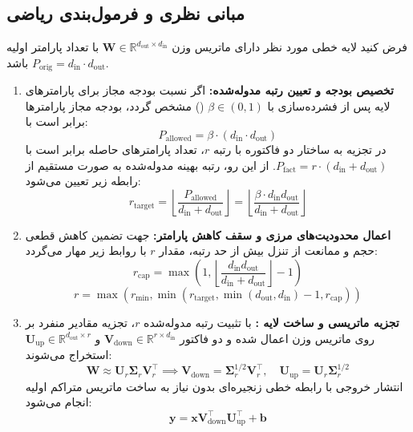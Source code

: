 \subsection{مبانی نظری و فرمول‌بندی ریاضی}
فرض کنید لایه خطی مورد نظر دارای ماتریس وزن $\mathbf{W} \in \mathbb{R}^{d_{\text{out}} \times d_{\text{in}}}$ با تعداد پارامتر اولیه $P_{\text{orig}} = d_{\text{in}} \cdot d_{\text{out}}$ باشد.

\begin{enumerate}
    \item \textbf{تخصیص بودجه و تعیین رتبه مدوله‌شده:}
    اگر نسبت بودجه مجاز برای پارامترهای لایه پس از فشرده‌سازی با $\beta \in (0, 1)$ () مشخص گردد، بودجه مجاز پارامترها برابر است با:
    \begin{equation}
    P_{\text{allowed}} = \beta \cdot (d_{\text{in}} \cdot d_{\text{out}})
    \end{equation}
    در تجزیه به ساختار دو فاکتوره با رتبه $r$، تعداد پارامترهای حاصله برابر است با $P_{\text{fact}} = r \cdot (d_{\text{in}} + d_{\text{out}})$. از این رو، رتبه بهینه مدوله‌شده به صورت مستقیم از رابطه زیر تعیین می‌شود:
    \begin{equation}
    r_{\text{target}} = \left\lfloor \frac{P_{\text{allowed}}}{d_{\text{in}} + d_{\text{out}}} \right\rfloor = \left\lfloor \frac{\beta \cdot d_{\text{in}} d_{\text{out}}}{d_{\text{in}} + d_{\text{out}}} \right\rfloor
    \end{equation}

    \item \textbf{اعمال محدودیت‌های مرزی و سقف کاهش پارامتر:}
    جهت تضمین کاهش قطعی حجم و ممانعت از تنزل بیش از حد رتبه، مقدار $r$ با روابط زیر مهار می‌گردد:
    \begin{equation}
    r_{\text{cap}} = \max\left(1, \left\lfloor \frac{d_{\text{in}} d_{\text{out}}}{d_{\text{in}} + d_{\text{out}}} \right\rfloor - 1\right)
    \end{equation}
    \begin{equation}
    r = \max\left(r_{\text{min}}, \min\left(r_{\text{target}}, \min(d_{\text{out}}, d_{\text{in}}) - 1, r_{\text{cap}}\right)\right)
    \end{equation}

    \item \textbf{تجزیه ماتریسی و ساخت لایه :}
    با تثبیت رتبه مدوله‌شده $r$، تجزیه مقادیر منفرد بر روی ماتریس وزن اعمال شده و دو فاکتور $\mathbf{V}_{\text{down}} \in \mathbb{R}^{r \times d_{\text{in}}}$ و $\mathbf{U}_{\text{up}} \in \mathbb{R}^{d_{\text{out}} \times r}$ استخراج می‌شوند:
    \begin{equation}
    \mathbf{W} \approx \mathbf{U}_r \mathbf{\Sigma}_r \mathbf{V}_r^\top \implies \mathbf{V}_{\text{down}} = \mathbf{\Sigma}_r^{1/2} \mathbf{V}_r^\top, \quad \mathbf{U}_{\text{up}} = \mathbf{U}_r \mathbf{\Sigma}_r^{1/2}
    \end{equation}
    انتشار خروجی با رابطه خطی زنجیره‌ای بدون نیاز به ساخت ماتریس متراکم اولیه انجام می‌شود:
    \begin{equation}
    \mathbf{y} = \mathbf{x} \mathbf{V}_{\text{down}}^\top \mathbf{U}_{\text{up}}^\top + \mathbf{b}
    \end{equation}
\end{enumerate}

